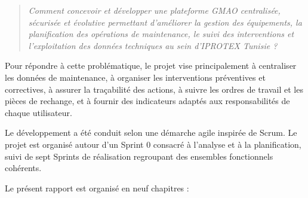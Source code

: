 \begin{quote}
\textit{Comment concevoir et développer une plateforme GMAO centralisée, sécurisée et évolutive permettant d’améliorer la gestion des équipements, la planification des opérations de maintenance, le suivi des interventions et l’exploitation des données techniques au sein d’IPROTEX Tunisie ?}
\end{quote}

Pour répondre à cette problématique, le projet vise principalement à centraliser les données de maintenance, à organiser les interventions préventives et correctives, à assurer la traçabilité des actions, à suivre les ordres de travail et les pièces de rechange, et à fournir des indicateurs adaptés aux responsabilités de chaque utilisateur.

Le développement a été conduit selon une démarche agile inspirée de Scrum. Le projet est organisé autour d’un Sprint 0 consacré à l’analyse et à la planification, suivi de sept Sprints de réalisation regroupant des ensembles fonctionnels cohérents.

Le présent rapport est organisé en neuf chapitres :

